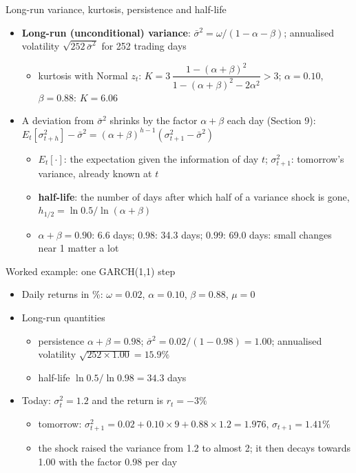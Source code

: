\begin{frame}{Long-run variance, kurtosis, persistence and half-life}
\itemsize{\small}
\begin{itemize}
    \item \textbf{Long-run (unconditional) variance}: $\bar\sigma^2 = \omega/(1 - \alpha - \beta)$; annualised volatility $\sqrt{252\,\bar\sigma^2}$ for 252 trading days
    \begin{itemize}
        \item kurtosis with Normal $z_t$: $K = 3\,\dfrac{1 - (\alpha + \beta)^2}{1 - (\alpha + \beta)^2 - 2\alpha^2} > 3$; $\alpha = 0.10$, $\beta = 0.88$: $K = 6.06$
    \end{itemize}
    \item A deviation from $\bar\sigma^2$ shrinks by the factor $\alpha + \beta$ each day (Section 9): $E_t[\sigma_{t+h}^2] - \bar\sigma^2 = (\alpha + \beta)^{h-1}(\sigma_{t+1}^2 - \bar\sigma^2)$
    \begin{itemize}
        \item $E_t[\cdot]$: the expectation given the information of day $t$; $\sigma_{t+1}^2$: tomorrow's variance, already known at $t$
        \item \textbf{half-life}: the number of days after which half of a variance shock is gone, $h_{1/2} = \ln 0.5/\ln(\alpha + \beta)$
        \item $\alpha + \beta = 0.90$: 6.6 days; $0.98$: 34.3 days; $0.99$: 69.0 days: small changes near 1 matter a lot
    \end{itemize}
\end{itemize}
\end{frame}

\begin{frame}{Worked example: one GARCH(1,1) step}
\itemsize{\small}
\begin{itemize}
    \item Daily returns in \%: $\omega = 0.02$, $\alpha = 0.10$, $\beta = 0.88$, $\mu = 0$
    \item Long-run quantities
    \begin{itemize}
        \item persistence $\alpha + \beta = 0.98$; $\bar\sigma^2 = 0.02/(1 - 0.98) = 1.00$; annualised volatility $\sqrt{252 \times 1.00} = 15.9\%$
        \item half-life $\ln 0.5/\ln 0.98 = 34.3$ days
    \end{itemize}
    \item Today: $\sigma_t^2 = 1.2$ and the return is $r_t = -3\%$
    \begin{itemize}
        \item tomorrow: $\sigma_{t+1}^2 = 0.02 + 0.10 \times 9 + 0.88 \times 1.2 = 1.976$, $\sigma_{t+1} = 1.41\%$
        \item the shock raised the variance from 1.2 to almost 2; it then decays towards 1.00 with the factor 0.98 per day
    \end{itemize}
\end{itemize}
\end{frame}

